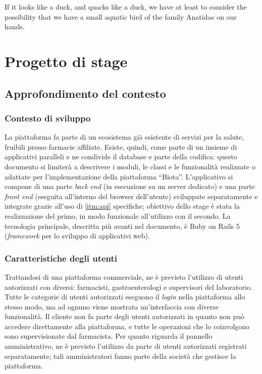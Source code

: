 
\begin{savequote}[75mm]
    If it looks like a duck, and quacks like a duck, we have at least to consider the possibility that we have a small aquatic bird of the family Anatidae on our hands.
\end{savequote}
\chapter{Progetto di stage}
\section{Approfondimento del contesto}
\subsection{Contesto di sviluppo}
\label{sec:devctx}
La piattaforma fa parte di un ecosistema già esistente di servizi per la salute, fruibili presso farmacie affiliate. Esiste, quindi, come parte di un insieme di applicativi paralleli e ne condivide il database e parte della codifica: questo documento si limiterà a descrivere i moduli, le classi e le funzionalità realizzate o adattate per l'implementazione della piattaforma ``Biota''.
L'applicativo si compone di una parte \textit{back end} (in esecuzione su un server dedicato) e una parte \textit{front end} (eseguita all'interno del browser dell'utente) sviluppate separatamente e integrate grazie all'uso di \ref{itm:api} specifiche; obiettivo dello stage è stata la realizzazione del primo, in modo funzionale all'utilizzo con il secondo. La tecnologia principale, descritta più avanti nel documento, è Ruby on Rails 5 (\textit{framework} per lo sviluppo di applicativi web).

\subsection{Caratteristiche degli utenti}
Trattandosi di una piattaforma commerciale, ne è previsto l'utilizzo di utenti autorizzati con diversi: farmacisti, gastroenterologi e supervisori del laboratorio. Tutte le categorie di utenti autorizzati eseguono il \textit{login} nella piattaforma allo stesso modo, ma ad ognuno viene mostrata un'interfaccia con diverse funzionalità. Il cliente non fa parte degli utenti autorizzati in quanto non può accedere direttamente alla piattaforma, e tutte le operazioni che lo coinvolgono sono supervisionate dal farmacista.
Per quanto riguarda il pannello amministrativo, ne è previsto l'utilizzo da parte di utenti autorizzati registrati separatamente; tali amministratori fanno parte della società che gestisce la piattaforma.

